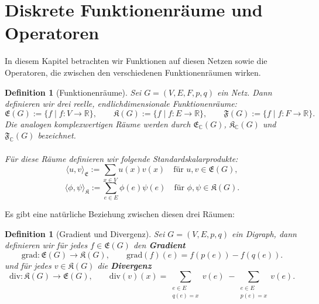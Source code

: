\documentclass[11pt,a4paper,leqno]{report}
\newtheorem{definition}[theorem]{Definition}
\numberwithin{equation}{chapter}
\begin{document}
\section{Diskrete Funktionenräume und Operatoren}
In diesem Kapitel betrachten wir Funktionen auf diesen Netzen sowie die Operatoren, die zwischen den verschiedenen Funktionenräumen wirken. 
\begin{definition}[Funktionenräume]
	Sei \(G=(V,E,F,p,q)\) ein Netz. Dann definieren wir drei reelle,
	endlichdimensionale Funktionenräume:
	\[
	\mathfrak{E}(G) := \{f \mid f: V \to \mathbb{R}\}, \qquad
	\mathfrak{K}(G) := \{f \mid f: E \to \mathbb{R}\}, \qquad
	\mathfrak{F}(G) := \{f \mid f: F \to \mathbb{R}\}.
	\]
	Die analogen komplexwertigen Räume werden durch
	\(\mathfrak{E}_\mathbb{C}(G)\), \(\mathfrak{K}_\mathbb{C}(G)\) und
	\(\mathfrak{F}_\mathbb{C}(G)\) bezeichnet.
	\\
	\\
	Für diese Räume definieren wir folgende Standardskalarprodukte:
	\[
	\langle u, v \rangle_{\mathfrak{E}} := \sum_{x\in V} u(x)v(x)
	\quad\text{für } u,v \in \mathfrak{E}(G),
	\]
	\[
	\langle \phi, \psi \rangle_{\mathfrak{K}} := \sum_{e\in E} \phi(e)\psi(e)
	\quad\text{für } \phi,\psi \in \mathfrak{K}(G).
	\]
\end{definition}
\noindent
Es gibt eine nat\"urliche Beziehung zwischen diesen drei R\"aumen:
\begin{definition}[Gradient und Divergenz]\label{def:grad_dev}
	Sei $G=(V,E, p, q)$ ein Digraph, dann definieren wir für jedes $f \in \mathfrak{E}(G)$ den \textbf{Gradient}
	\[
	\mathrm{grad}:\mathfrak{E}(G) \to \mathfrak{K}(G), \qquad 
	\mathrm{grad}(f)(e) = f(p(e)) - f(q(e)).
	\]
	und für jedes $v\in \mathfrak{K}(G)$ die \textbf{Divergenz}
	\[
	\mathrm{div}:\mathfrak{K}(G) \to \mathfrak{E}(G), \qquad 
	\mathrm{div}(v)(x) = 
	\sum_{\substack{e\in E \\ q(e)=x}}v(e) \;-\!
	\sum_{\substack{e\in E \\ p(e)=x}}v(e).
	\]
\end{definition}
\noindent
\end{document}
